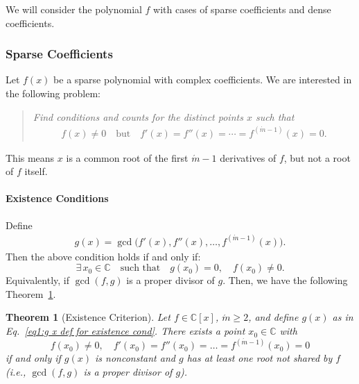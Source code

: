 \documentclass[11pt]{article}
\newtheorem{theorem}{Theorem}
\begin{document}
We will consider the polynomial $f$ with cases of sparse coefficients and dense coefficients. 

\subsubsection{Sparse Coefficients}

Let \( f(x) \) be a sparse polynomial with complex coefficients. We are interested in the following problem:  

\begin{quote}
\emph{Find conditions and counts for the distinct points \( x \) such that}
%
\begin{eqnarray}\label{eq:S f diag conditions}
f(x) \neq 0 
\quad \text{but} \quad 
f'(x) = f''(x) = \cdots = f^{(\acute{m}-1)}(x) = 0.
\end{eqnarray}
%
\end{quote}

This means \( x \) is a common root of the first \( \acute{m}-1 \) derivatives of \( f \), but not a root of \( f \) itself.  

\paragraph{Existence Conditions}

Define
%
\begin{eqnarray}\label{eq1:g x def for existence cond}
g(x) = \gcd\big(f'(x), f''(x), \ldots, f^{(\acute{m}-1)}(x)\big).
\end{eqnarray}
%
Then the above condition holds if and only if:
\[
\exists \, x_0 \in \mathbb{C} \quad \text{such that} \quad g(x_0)=0, \quad f(x_0)\neq 0.
\]
Equivalently, if \(\gcd(f, g)\) is a proper divisor of \(g\). Then, we have the following Theorem~\ref{thm:S Existence Criterion}.

\begin{theorem}[Existence Criterion]\label{thm:S Existence Criterion}
Let $f \in \mathbb{C}[x]$, $\acute{m} \ge 2$, and define $g(x)$ as in Eq.~\eqref{eq1:g x def for existence cond}. There exists a point $x_0 \in \mathbb{C}$ with
\[
f(x_0) \neq 0, \quad f'(x_0) = f''(x_0) = \dots = f^{(\acute{m}-1)}(x_0) = 0
\]
if and only if $g(x)$ is nonconstant and $g$ has at least one root not shared by $f$ (i.e., $\gcd(f, g)$ is a proper divisor of $g$).
\end{theorem}
\end{document}
